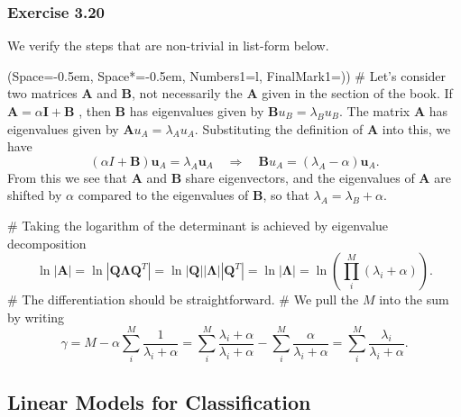 \documentclass[12pt, a4paper]{article}
\newcommand{\listSpace}{-0.5em}%
\newcommand{\vect}[1]{\bm{#1}}
\newcommand{\abs}[1]{\left\lvert#1\right\rvert}
\begin{document}
\subsubsection*{Exercise 3.20}
We verify the steps that are non-trivial in list-form below.
\begin{easylist}[itemize]
	\ListProperties(Space=\listSpace, Space*=\listSpace, Numbers1=l, FinalMark1={)})
	# Let's consider two matrices $\vect{A}$ and $\vect{B}$, not necessarily the $\vect{A}$ given in the section of the book.
	If $\vect{A} = \alpha \vect{I} + \vect{B}$ , then $\vect{B}$ has eigenvalues given by
	$\vect{B} u_B = \lambda_B u_B$.
	The matrix $\vect{A}$ has eigenvalues given by $\vect{A} u_A = \lambda_A u_A$.
	Substituting the definition of $\vect{A}$ into this, we have
	\begin{equation*}
		\left( \alpha I + \vect{B} \right) \vect{u}_A = \lambda_A \vect{u}_A
		\quad \Rightarrow \quad
		\vect{B} u_A = (\lambda_A - \alpha) \vect{u}_A.
	\end{equation*}
	From this we see that $\vect{A}$ and $\vect{B}$ share eigenvectors, and the eigenvalues of $\vect{A}$ are shifted by $\alpha$ compared to the eigenvalues of $\vect{B}$, so that $\lambda_A = \lambda_B + \alpha$.
	
	# Taking the logarithm of the determinant is achieved by eigenvalue decomposition
	\begin{equation*}
		\ln \abs{ \vect{A} }
		=
		\ln \abs{ \vect{Q} \vect{\Lambda} \vect{Q}^T }
		=
		\ln \abs{ \vect{Q} }
		\abs{  \vect{\Lambda}}
		\abs{  \vect{Q}^T }
		=
		\ln
		\abs{  \vect{\Lambda}}
		= \ln \left( \prod_{i}^{M} (\lambda_i + \alpha) \right).
	\end{equation*}
	# The differentiation should be straightforward.
	# We pull the $M$ into the sum by writing
	\begin{equation*}
		\gamma = M - \alpha \sum_{i}^{M} \frac{1}{\lambda_i + \alpha}
		=
		\sum_{i}^{M} \frac{\lambda_i + \alpha}{\lambda_i + \alpha} -  \sum_{i}^{M} \frac{\alpha}{\lambda_i + \alpha}
		=
		\sum_{i}^{M} \frac{\lambda_i}{\lambda_i + \alpha}.
	\end{equation*}
\end{easylist}

\subsection{Linear Models for Classification}
\end{document}
